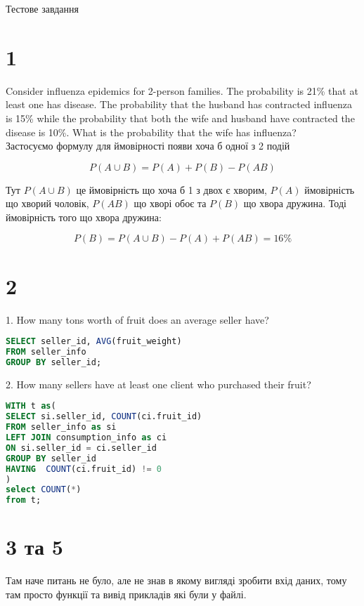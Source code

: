 \documentclass[14pt]{extarticle}
\begin{document}
\begin{center}
Тестове завдання
\end{center}

\section*{1}
Consider influenza epidemics for 2-person families. The probability is 21\% that at least one has disease. The probability that the husband has contracted influenza is 15\% while the probability that both the wife and husband have contracted the disease is 10\%. What is the probability that the wife has influenza?\\

Застосуємо формулу для ймовірності появи хоча б одної з 2 подій

\begin{equation*}
P(A\cup B)=P(A)+P(B)-P(AB)
\end{equation*}

Тут $ P(A\cup B) $ це ймовірність що хоча б 1 з двох є хворим, $ P(A) $ ймовірність що хворий чоловік, $ P(AB) $ що хворі обоє та $ P(B) $ що хвора дружина. Тоді ймовірність того що хвора дружина:

\begin{equation*}
P(B) = P(A\cup B) - P(A) + P(AB) = 16\%
\end{equation*}

\section*{2}

1. How many tons worth of fruit does an average seller have?
\begin{lstlisting}[language=SQL]
SELECT seller_id, AVG(fruit_weight)
FROM seller_info
GROUP BY seller_id;
\end{lstlisting}

2. How many sellers have at least one client who purchased their fruit?
\begin{lstlisting}[language=SQL]
WITH t as(
SELECT si.seller_id, COUNT(ci.fruit_id)
FROM seller_info as si
LEFT JOIN consumption_info as ci
ON si.seller_id = ci.seller_id
GROUP BY seller_id
HAVING  COUNT(ci.fruit_id) != 0
)
select COUNT(*)
from t;
\end{lstlisting}

\section*{3 та 5}
Там наче питань не було, але не знав в якому вигляді зробити вхід даних, тому там просто функції та вивід прикладів які були у файлі.
\end{document}
